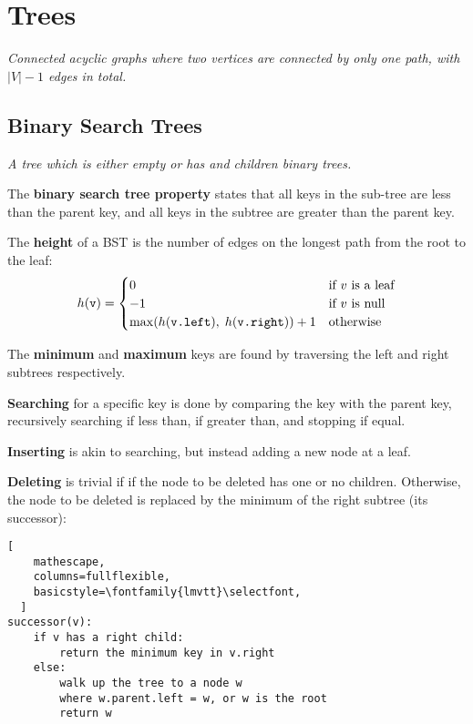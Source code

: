 \section{Trees}
\emph{Connected acyclic graphs where two vertices are connected by only one path, with $|V| - 1$ edges in total.}

\subsection{Binary Search Trees}
\emph{A tree which is either empty or has  and  children binary trees.}

The \textbf{binary search tree property} states that all keys in the  sub-tree are less than the parent key,
and all keys in the  subtree are greater than the parent key.

The \textbf{height} of a BST is the number of edges on the longest path from the root to the leaf:\\[-0.2em]
\[ h(\texttt{v}) = \begin{cases} 
    0 & \text{if $v$ is a leaf} \\
    -1 & \text{if $v$ is null} \\
    \max(h(\texttt{v.left}), \; h(\texttt{v.right})) + 1 & \text{otherwise} \\
 \end{cases}
\]

The \textbf{minimum} and \textbf{maximum} keys are found by traversing the left and right subtrees respectively.

\textbf{Searching} for a specific key is done by comparing the key with the parent key,
recursively searching  if less than,  if greater than, and stopping if equal.

\textbf{Inserting} is akin to searching, but instead adding a new node at a leaf.

\textbf{Deleting} is trivial if if the node to be deleted has one or no children.
Otherwise, the node to be deleted is replaced by the minimum of the right subtree (its successor):

\begin{lstlisting}[
    mathescape,
    columns=fullflexible,
    basicstyle=\fontfamily{lmvtt}\selectfont,
  ]
successor(v):
    if v has a right child:
        return the minimum key in v.right
    else:
        walk up the tree to a node w
        where w.parent.left = w, or w is the root
        return w
\end{lstlisting}

